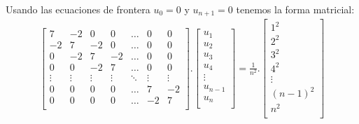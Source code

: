 \begin{itemize}
Usando las ecuaciones de frontera $u_0=0$ y $u_{n+1}=0$ tenemos la forma matricial:\\
\begin{gather*}
\begin{bmatrix}
       7 & -2 & 0 & 0 & \dots & 0 & 0 \\
       -2 & 7 & -2 & 0 & \dots & 0 & 0 \\
       0 & -2 & 7 & -2 & \dots & 0 & 0 \\
       0 & 0 & -2 & 7 & \dots & 0 & 0 \\
       \vdots & \vdots & \vdots & \vdots & \ddots & \vdots & \vdots \\
       0 & 0 & 0 & 0 & \dots & 7 & -2 \\
       0 & 0 & 0 & 0 & \dots & -2 & 7 \\
\end{bmatrix}.
\begin{bmatrix}
    u_1 \\
    u_2 \\
    u_3 \\
    u_4 \\
    \vdots \\
    u_{n-1} \\
    u_n \\
\end{bmatrix}
 = \frac{1}{n^2}.
\begin{bmatrix}
    1^2 \\
    2^2 \\
    3^2 \\
    4^2 \\
    \vdots \\
    (n-1)^2 \\
    n^2 \\
\end{bmatrix}
\end{gather*}



\end{itemize}